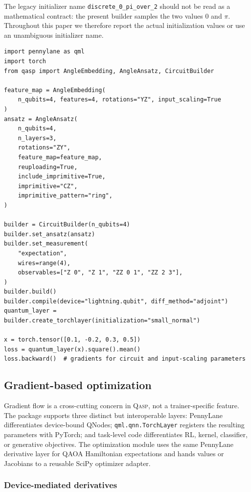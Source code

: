 \documentclass[10pt]{article}
\newcommand{\qasp}{\textsc{Qasp}}
\newcommand{\code}[1]{\texttt{#1}}
\newcommand{\version}{0.1.0}
\begin{document}
The legacy initializer name \code{discrete\_0\_pi\_over\_2} should not be read
as a mathematical contract: the present builder samples the two values $0$ and
$\pi$.  Throughout this paper we therefore report the actual initialization
values or use an unambiguous initializer name.

\begin{lstlisting}[caption={Low-level construction of a differentiable quantum layer.  The snippet uses public release-\version{} interfaces.},label={lst:builder}]
import pennylane as qml
import torch
from qasp import AngleEmbedding, AngleAnsatz, CircuitBuilder

feature_map = AngleEmbedding(
    n_qubits=4, features=4, rotations="YZ", input_scaling=True
)
ansatz = AngleAnsatz(
    n_qubits=4,
    n_layers=3,
    rotations="ZY",
    feature_map=feature_map,
    reuploading=True,
    include_imprimitive=True,
    imprimitive="CZ",
    imprimitive_pattern="ring",
)

builder = CircuitBuilder(n_qubits=4)
builder.set_ansatz(ansatz)
builder.set_measurement(
    "expectation",
    wires=range(4),
    observables=["Z 0", "Z 1", "ZZ 0 1", "ZZ 2 3"],
)
builder.build()
builder.compile(device="lightning.qubit", diff_method="adjoint")
quantum_layer = builder.create_torchlayer(initialization="small_normal")

x = torch.tensor([0.1, -0.2, 0.3, 0.5])
loss = quantum_layer(x).square().mean()
loss.backward()  # gradients for circuit and input-scaling parameters
\end{lstlisting}

\subsection{Gradient-based optimization}
\label{sec:gradients}

Gradient flow is a cross-cutting concern in \qasp{}, not a trainer-specific
feature.  The package supports three distinct but interoperable layers:
PennyLane differentiates device-bound QNodes;
\code{qml.qnn.TorchLayer} registers the resulting parameters with PyTorch; and
task-level code differentiates RL, kernel, classifier, or generative
objectives.  The optimization module uses the same PennyLane derivative layer
for QAOA Hamiltonian expectations and hands values or Jacobians to a reusable
SciPy optimizer adapter.

\subsubsection{Device-mediated derivatives}
\end{document}
